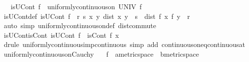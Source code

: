 \begin{isabellebody}
\ \ \ {\isachardoublequoteopen}isUCont\ f\ {\isasymequiv}\ uniformly{\isacharunderscore}{\kern0pt}continuous{\isacharunderscore}{\kern0pt}on\ UNIV\ f{\isachardoublequoteclose}\isanewline
\isanewline
{}\isamarkupfalse%
\ isUCont{\isacharunderscore}{\kern0pt}def{\isacharcolon}{\kern0pt}\ {\isachardoublequoteopen}isUCont\ f\ {\isasymlongleftrightarrow}\ {\isacharparenleft}{\kern0pt}{\isasymforall}r{\isachargreater}{\kern0pt}{}{\isachardot}{\kern0pt}\ {\isasymexists}s{\isachargreater}{\kern0pt}{}{\isachardot}{\kern0pt}\ {\isasymforall}x\ y{\isachardot}{\kern0pt}\ dist\ x\ y\ {\isacharless}{\kern0pt}\ s\ {\isasymlongrightarrow}\ dist\ {\isacharparenleft}{\kern0pt}f\ x{\isacharparenright}{\kern0pt}\ {\isacharparenleft}{\kern0pt}f\ y{\isacharparenright}{\kern0pt}\ {\isacharless}{\kern0pt}\ r{\isacharparenright}{\kern0pt}{\isachardoublequoteclose}\isanewline
%
\isadelimproof
\ \ %
\endisadelimproof
%
\isatagproof
{}\isamarkupfalse%
\ {\isacharparenleft}{\kern0pt}auto\ simp{\isacharcolon}{\kern0pt}\ uniformly{\isacharunderscore}{\kern0pt}continuous{\isacharunderscore}{\kern0pt}on{\isacharunderscore}{\kern0pt}def\ dist{\isacharunderscore}{\kern0pt}commute{\isacharparenright}{\kern0pt}%
\endisatagproof
{\isafoldproof}%
%
\isadelimproof
\isanewline
%
\endisadelimproof
\isanewline
{}\isamarkupfalse%
\ isUCont{\isacharunderscore}{\kern0pt}isCont{\isacharcolon}{\kern0pt}\ {\isachardoublequoteopen}isUCont\ f\ {\isasymLongrightarrow}\ isCont\ f\ x{\isachardoublequoteclose}\isanewline
%
\isadelimproof
\ \ %
\endisadelimproof
%
\isatagproof
{}\isamarkupfalse%
\ {\isacharparenleft}{\kern0pt}drule\ uniformly{\isacharunderscore}{\kern0pt}continuous{\isacharunderscore}{\kern0pt}imp{\isacharunderscore}{\kern0pt}continuous{\isacharparenright}{\kern0pt}\ {\isacharparenleft}{\kern0pt}simp\ add{\isacharcolon}{\kern0pt}\ continuous{\isacharunderscore}{\kern0pt}on{\isacharunderscore}{\kern0pt}eq{\isacharunderscore}{\kern0pt}continuous{\isacharunderscore}{\kern0pt}at{\isacharparenright}{\kern0pt}%
\endisatagproof
{\isafoldproof}%
%
\isadelimproof
\isanewline
%
\endisadelimproof
\isanewline
{}\isamarkupfalse%
\ uniformly{\isacharunderscore}{\kern0pt}continuous{\isacharunderscore}{\kern0pt}on{\isacharunderscore}{\kern0pt}Cauchy{\isacharcolon}{\kern0pt}\isanewline
\ \ \ f\ {\isacharcolon}{\kern0pt}{\isacharcolon}{\kern0pt}\ {\isachardoublequoteopen}{\isacharprime}{\kern0pt}a{\isacharcolon}{\kern0pt}{\isacharcolon}{\kern0pt}metric{\isacharunderscore}{\kern0pt}space\ {\isasymRightarrow}\ {\isacharprime}{\kern0pt}b{\isacharcolon}{\kern0pt}{\isacharcolon}{\kern0pt}metric{\isacharunderscore}{\kern0pt}space{\isachardoublequoteclose}\isanewline

\end{isabellebody}
